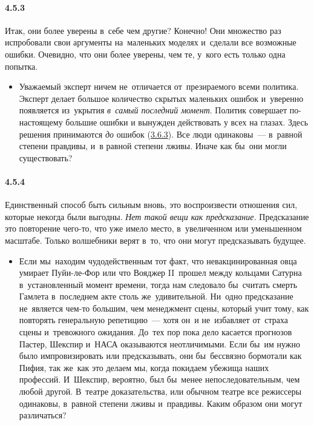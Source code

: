 \paragraph{4.5.3}\hypertarget{par:4.5.3}{} Итак, они более уверены в~себе чем другие? Конечно! Они множество раз испробовали свои аргументы на~маленьких моделях и~сделали все возможные ошибки. Очевидно, что они более уверены, чем те, у~кого есть только одна попытка.
	\begin{itemize}
	\item 
	Уважаемый эксперт ничем не~отличается от~презираемого всеми политика. Эксперт делает большое количество скрытых маленьких ошибок и~уверенно появляется из~укрытия {\itshape в~самый последний момент}. Политик совершает по-настоящему большие ошибки и вынужден действовать у всех на глазах. Здесь решения принимаются {\itshape до} ошибок (\hyperlink{par:3.6.3}{3.6.3}). Все люди одинаковы~--- в~равной степени правдивы, и~в равной степени лживы. Иначе как бы~они могли существовать?
	\end{itemize}	 

\paragraph{4.5.4}\hypertarget{par:4.5.4}{} Единственный способ быть сильным вновь, это воспроизвести отношения сил, которые некогда были выгодны. {\itshape Нет такой вещи как предсказание.} Предсказание это повторение чего-то, что уже имело место, в~увеличенном или уменьшенном масштабе. Только волшебники верят в~то, что они могут предсказывать будущее. 
	\begin{itemize}
	\item 
	Если мы~находим чудодейственным тот факт, что невакцинированная овца умирает Пуйи-ле-Фор или что Вояджер II~прошел между кольцами Сатурна в~установленный момент времени, тогда нам следовало бы~считать смерть Гамлета в~последнем акте столь же~удивительной. Ни~одно предсказание не~является чем-то большим, чем менеджмент сцены, который учит тому, как повторять генеральную репетицию~--- хотя он~и не~избавляет от~страха сцены и~тревожного ожидания. До~тех пор пока дело касается прогнозов Пастер, Шекспир и~НАСА оказываются неотличимыми. Если бы~им нужно было импровизировать или предсказывать, они бы~бессвязно бормотали как Пифия, так же~как это делаем мы, когда покидаем убежища наших профессий. И~Шекспир, вероятно, был бы~менее непоследовательным, чем любой другой. В~театре доказательства, или обычном театре все режиссеры одинаковы, в~равной степени лживы и~правдивы. Каким образом они могут различаться?
	\end{itemize}	

